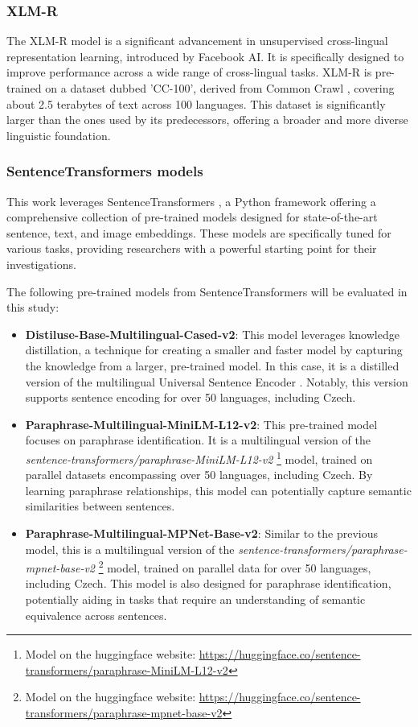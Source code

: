\subsubsection{XLM-R} \label{model:xlm-roberta}
The \ac{XLM-R} model \cite{conneau2020unsupervised} is a significant advancement in unsupervised cross-lingual representation learning, introduced by Facebook AI.
It is specifically designed to improve performance across a wide range of cross-lingual tasks.
\ac{XLM-R} is pre-trained on a dataset dubbed 'CC-100', derived from Common Crawl \cite{commoncrawl}, covering about 2.5 terabytes of text across 100 languages.
This dataset is significantly larger than the ones used by its predecessors, offering a broader and more diverse linguistic foundation.

\subsubsection{SentenceTransformers models} \label{model:st-multilingual}

This work leverages SentenceTransformers \cite{reimers2019sentencebert}, a Python framework offering a comprehensive collection of pre-trained models designed for state-of-the-art sentence, text, and image embeddings.
These models are specifically tuned for various tasks, providing researchers with a powerful starting point for their investigations.

The following pre-trained models from SentenceTransformers will be evaluated in this study:
\begin{itemize}
  \item \textbf{Distiluse-Base-Multilingual-Cased-v2}:
    This model leverages knowledge distillation, a technique for creating a smaller and faster model by capturing the knowledge from a larger, pre-trained model.
    In this case, it is a distilled version of the multilingual Universal Sentence Encoder \cite{yang2019multilingual}.
    Notably, this version supports sentence encoding for over 50 languages, including Czech.
  \item \textbf{Paraphrase-Multilingual-MiniLM-L12-v2}: This pre-trained model focuses on paraphrase identification.
    It is a multilingual version of the \textit{sentence-transformers/paraphrase-MiniLM-L12-v2} \footnote{Model on the huggingface website: \url{https://huggingface.co/sentence-transformers/paraphrase-MiniLM-L12-v2}} model, trained on parallel datasets encompassing over 50 languages, including Czech.
    By learning paraphrase relationships, this model can potentially capture semantic similarities between sentences.
  \item \textbf{Paraphrase-Multilingual-MPNet-Base-v2}: Similar to the previous model, this is a multilingual version of the \textit{sentence-transformers/paraphrase-mpnet-base-v2} \footnote{ Model on the huggingface website: \url{https://huggingface.co/sentence-transformers/paraphrase-mpnet-base-v2}} model, trained on parallel data for over 50 languages, including Czech.
    This model is also designed for paraphrase identification, potentially aiding in tasks that require an understanding of semantic equivalence across sentences.
\end{itemize}


